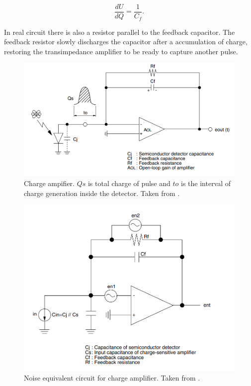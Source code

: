 \begin{equation}
\frac{dU}{dQ} = \frac{1}{C_{f}}.
\end{equation}
\par
In real circuit there is also a resistor parallel to the feedback capacitor. The feedback resistor slowly discharges the capacitor after a accumulation of charge, restoring the transimpedance amplifier to be ready to capture another pulse.

\begin{figure}[H]
 \centering
 \includegraphics[scale=0.4, angle = 0]{./pictures/champlifier.png}
 \caption{Charge ampifier. $Qs$ is total charge of pulse and $to$ is the interval of charge generation inside the detector. Taken from \cite{charge}.}
 \label{trans}
 
\end{figure}





\begin{figure}[H]
 \centering
 \includegraphics[scale=0.4, angle = 0]{./pictures/NoiseEquiv.png}
 \caption{Noise equivalent circuit for charge amplifier. Taken from \cite{charge}.}
 \label{transNoise}
 
\end{figure}


